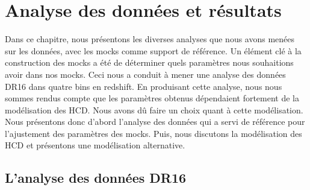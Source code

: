 \documentclass[11pt, twoside, a4paper, openright]{report}
\begin{document}
\graphicspath{ {../figures/data_ana/} }

\chapter{Analyse des données et résultats}
\label{chap:data_ana}
\minitoc
\newpage
\thispagestyle{fancy}

Dans ce chapitre, nous présentons les diverses analyses que nous avons menées sur les données, avec les mocks comme support de référence.
Un élément clé à la construction des mocks a été de déterminer quels paramètres \lya{} nous souhaitions avoir dans nos mocks.
Ceci nous a conduit à mener une analyse des données DR16 dans quatre bins en redshift.
En produisant cette analyse, nous nous sommes rendus compte que les paramètres \lya{} obtenus dépendaient fortement de la modélisation des HCD. Nous avons dû faire un choix quant à cette modélisation.
Nous présentons donc d'abord l'analyse des données qui a servi de référence pour l'ajustement des paramètres des mocks. Puis, nous discutons la modélisation des HCD et présentons une modélisation alternative.



\section{L'analyse des données DR16}
\end{document}
